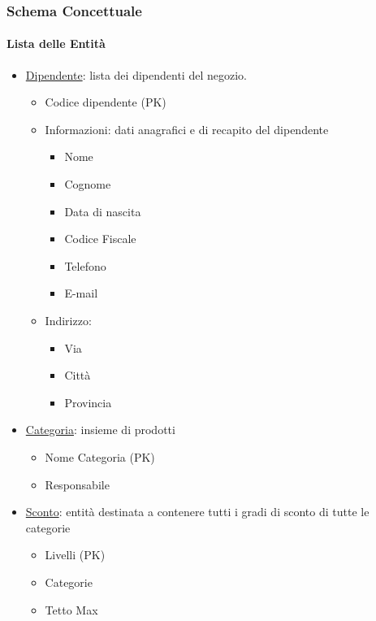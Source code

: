 \subsubsection{Schema Concettuale}

\paragraph*{Lista delle Entit\`a}

\begin{itemize}

\item \underline{Dipendente}: lista dei dipendenti del negozio.
  
  \begin{itemize}

  \item Codice dipendente (PK)
    
  \item Informazioni: dati anagrafici e di recapito del dipendente
    \begin{itemize}
    \item Nome
    \item Cognome
    \item Data di nascita
    \item Codice Fiscale
    \item Telefono
    \item E-mail
    \end{itemize}
    
  \item Indirizzo:
    \begin{itemize}
    \item Via
    \item Citt\`a
    \item Provincia
    \end{itemize}

  \end{itemize}

\item \underline{Categoria}: insieme di prodotti
  \begin{itemize}
  \item Nome Categoria (PK)
  \item Responsabile
  \end{itemize}

\item \underline{Sconto}: entit\`a destinata a contenere tutti i gradi di sconto di tutte le categorie
  \begin{itemize}
  \item Livelli (PK)
  \item Categorie
  \item Tetto Max
  \end{itemize}


\end{itemize}
